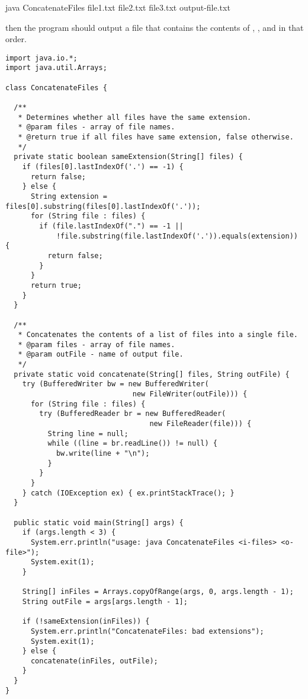 \begin{verbnobox}[\small]
java ConcatenateFiles file1.txt file2.txt file3.txt output-file.txt
\end{verbnobox}
then the program should output a file  that contains the contents of , , and  in that order. 

\begin{lstlisting}[language=MyJava]
import java.io.*;
import java.util.Arrays;

class ConcatenateFiles {
 
  /**
   * Determines whether all files have the same extension.
   * @param files - array of file names.
   * @return true if all files have same extension, false otherwise.
   */
  private static boolean sameExtension(String[] files) {
    if (files[0].lastIndexOf('.') == -1) { 
      return false; 
    } else {
      String extension = files[0].substring(files[0].lastIndexOf('.'));
      for (String file : files) {
        if (file.lastIndexOf(".") == -1 || 
            !file.substring(file.lastIndexOf('.')).equals(extension)) { 
          return false; 
        }
      }
      return true;
    }
  }

  /**
   * Concatenates the contents of a list of files into a single file.
   * @param files - array of file names.
   * @param outFile - name of output file.
   */
  private static void concatenate(String[] files, String outFile) {
    try (BufferedWriter bw = new BufferedWriter(
                              new FileWriter(outFile))) {
      for (String file : files) {
        try (BufferedReader br = new BufferedReader(
                                  new FileReader(file))) {
          String line = null;
          while ((line = br.readLine()) != null) { 
            bw.write(line + "\n"); 
          }
        }
      }
    } catch (IOException ex) { ex.printStackTrace(); }
  }

  public static void main(String[] args) {
    if (args.length < 3) {
      System.err.println("usage: java ConcatenateFiles <i-files> <o-file>");
      System.exit(1);
    }

    String[] inFiles = Arrays.copyOfRange(args, 0, args.length - 1);
    String outFile = args[args.length - 1];

    if (!sameExtension(inFiles)) {
      System.err.println("ConcatenateFiles: bad extensions");
      System.exit(1);
    } else {
      concatenate(inFiles, outFile);
    }
  }
}
\end{lstlisting}



